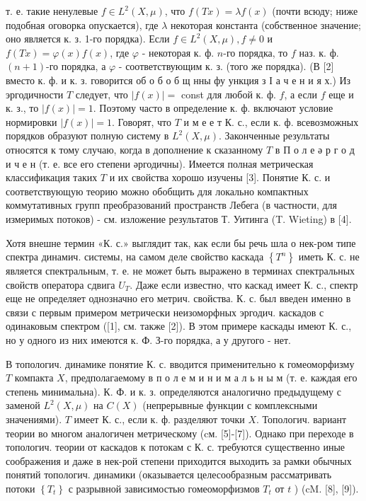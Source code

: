 \documentclass[10pt]{article}
\begin{document}
т. е. такие ненулевые $f \in L^{2}(X, \mu)$, что $f(T x)=\lambda f(x)$ (почти всюду; ниже подобная оговорка опускается), где $\lambda$ некоторая константа (собственное значение; оно является к. з. 1-го порядка). Если $f \in L^{2}(X, \mu), f \neq 0$ и $f(T x)=\varphi(x) f(x)$, где $\varphi$ - некоторая к. ф. $n$-го порядка, то $f$ наз. к. ф. $(n+1)$-го порядка, а $\varphi$ - соответствующим к. з. (того же порядка). (В [2] вместо к. ф. и к. з. говорится об о б о б щ нны фу ункция з І а ч е н и я х.) Из эргодичности $T$ следует, что $|f(x)|=$ const для любой к. ф. $f$, а если $f$ еще и к. з., то $|f(x)|=1$. Поэтому часто в определение к. ф. включают условие нормировки $|f(x)|=1$. Говорят, что $T$ и м е е т К. с., если к. ф. всевозможных порядков образуют полную систему в $L^{2}(X, \mu)$. Законченные результаты относятся к тому случаю, когда в дополнение к сказанному $T$ в П о л е ә р г о д и ч е н (т. е. все его степени әргодичны). Имеется полная метрическая классификация таких $T$ и их свойства хорошо изучены [3]. Понятие К. с. и соответствующую теорию можно обобщить для локально компактных коммутативных групп преобразований пространств Лебега (в частности, для измеримых потоков) - см. изложение результатов Т. Уитинга (T. Wieting) в [4].



Хотя внешне термин «К. с.» выглядит так, как если бы речь шла о нек-ром типе спектра динамич. системы, на самом деле свойство каскада $\left\{T^{n}\right\}$ иметь $К$. с. не является спектральным, т. е. не может быть выражено в терминах спектральных свойств оператора сдвига $U_{T}$. Даже если известно, что каскад имеет К. с., спектр еще не определяет однозначно его метрич. свойства. К. с. был введен именно в связи с первым примером метрически неизоморфных эргодич. каскадов с одинаковым спектром ([1], см. также [2]). В этом примере каскады имеют К. с., но у одного из них имеются к. Ф. З-го порядка, а у другого - нет.



В топологич. динамике понятие К. с. вводится применительно к гомеоморфизму $T$ компакта $X$, предполагаемому в п о л е м и н и м а л ь н ы м (т. е. каждая его степень минимальна). К. Ф. и к. з. определяются аналогично предыдущему с заменой $L^{2}(X, \mu)$ на $C(X)$ (непрерывные функции с комплексными значениями). $T$ имеет К. с., если к. ф. разделяют точки $X$. Топологич. вариант теории во многом аналогичен метрическому (cм. [5]-[7]). Однако при переходе в топологич. теории от каскадов к потокам с К. с. требуются существенно иные соображения и даже в нек-рой степени приходится выходить за рамки обычных понятий топологич. динамики (оказывается целесообразным рассматривать потоки $\left\{T_{t}\right\}$ с разрывной зависимостью гомеоморфизмов $T_{t}$ от $t$ ) (cM. [8], [9]).
\end{document}
